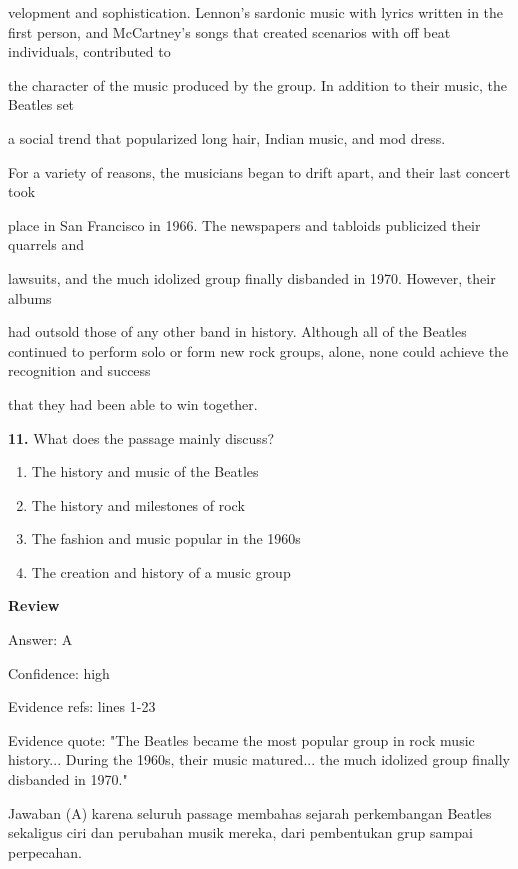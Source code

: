 \documentclass[12pt]{article}
\begin{document}
velopment and sophistication. Lennon's sardonic music with lyrics written in the first person, and McCartney's songs that created scenarios with off beat individuals, contributed to\par
the character of the music produced by the group. In addition to their music, the Beatles set\par
a social trend that popularized long hair, Indian music, and mod dress.\par
For a variety of reasons, the musicians began to drift apart, and their last concert took\par
place in San Francisco in 1966. The newspapers and tabloids publicized their quarrels and\par
lawsuits, and the much idolized group finally disbanded in 1970. However, their albums\par
had outsold those of any other band in history. Although all of the Beatles continued to perform solo or form new rock groups, alone, none could achieve the recognition and success\par
that they had been able to win together.\par
\endgroup
\medskip
\noindent\textbf{11.} What does the passage mainly discuss?
\begin{enumerate}[label=(\Alph*),leftmargin=*,itemsep=0.2em]
\item The history and music of the Beatles
\item The history and milestones of rock
\item The fashion and music popular in the 1960s
\item The creation and history of a music group
\end{enumerate}
\par
\begingroup
\setlength{\parskip}{0pt}
\setlength{\parindent}{0pt}
\textbf{Review}\par
Answer: A\par
Confidence: high\par
Evidence refs: lines 1-23\par
Evidence quote: "The Beatles became the most popular group in rock music history... During the 1960s, their music matured... the much idolized group finally disbanded in 1970."\par
Jawaban (A) karena seluruh passage membahas sejarah perkembangan Beatles sekaligus ciri dan perubahan musik mereka, dari pembentukan grup sampai perpecahan.\par
\endgroup
\par
\vspace{0.25\baselineskip}
\end{document}

